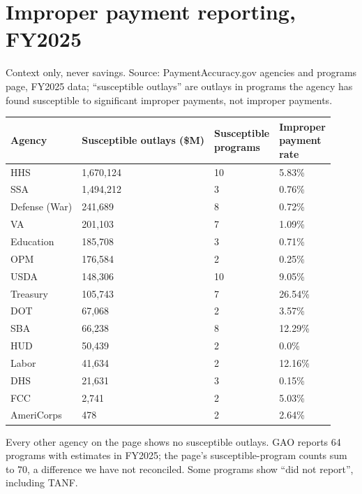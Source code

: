 \documentclass[letterpaper,11pt]{article}
\begin{document}
\hypertarget{improper-payment-reporting-fy2025}{%
\section{Improper payment reporting,
FY2025}\label{improper-payment-reporting-fy2025}}

Context only, never savings. Source: PaymentAccuracy.gov agencies and
programs page, FY2025 data; ``susceptible outlays'' are outlays in
programs the agency has found susceptible to significant improper
payments, not improper payments.

\begingroup\small\setlength{\tabcolsep}{4pt}\renewcommand{\arraystretch}{1.25}
\begin{longtable}[l]{@{}>{\raggedright\arraybackslash}p{}lll@{}}
\rowcolor{coolblack}\leavevmode\color{white}\bfseries Agency & \leavevmode\color{white}\bfseries \makecell[tl]{Susceptible\\outlays\\(\$M)} & \leavevmode\color{white}\bfseries \makecell[tl]{Susceptible\\programs} & \leavevmode\color{white}\bfseries \makecell[tl]{Improper\\payment\\rate} \\
\endhead
HHS & 1,670,124 & 10 & 5.83\% \\
SSA & 1,494,212 & 3 & 0.76\% \\
Defense (War) & 241,689 & 8 & 0.72\% \\
VA & 201,103 & 7 & 1.09\% \\
Education & 185,708 & 3 & 0.71\% \\
OPM & 176,584 & 2 & 0.25\% \\
USDA & 148,306 & 10 & 9.05\% \\
Treasury & 105,743 & 7 & 26.54\% \\
DOT & 67,068 & 2 & 3.57\% \\
SBA & 66,238 & 8 & 12.29\% \\
HUD & 50,439 & 2 & 0.0\% \\
Labor & 41,634 & 2 & 12.16\% \\
DHS & 21,631 & 3 & 0.15\% \\
FCC & 2,741 & 2 & 5.03\% \\
AmeriCorps & 478 & 2 & 2.64\% \\
\end{longtable}\endgroup

Every other agency on the page shows no susceptible outlays. GAO reports
64 programs with estimates in FY2025; the page's susceptible-program
counts sum to 70, a difference we have not reconciled. Some programs
show ``did not report'', including TANF.
\end{document}
